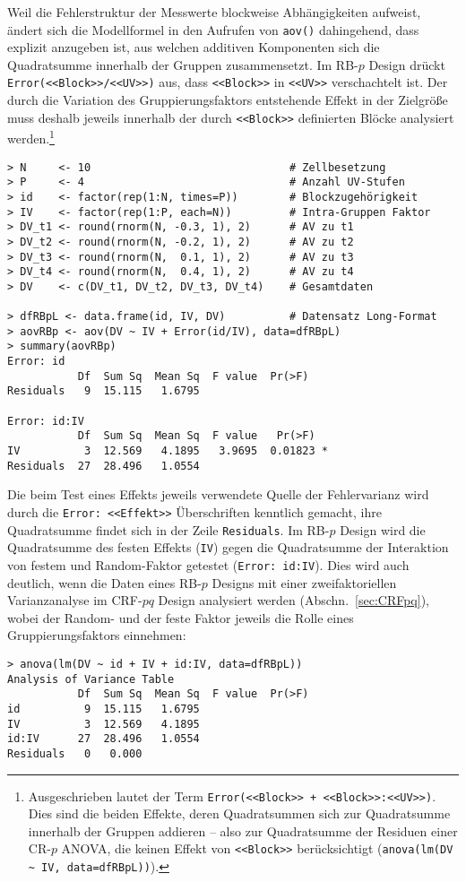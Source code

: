 Weil die Fehlerstruktur der Messwerte blockweise Abhängigkeiten aufweist, ändert sich die Modellformel in den Aufrufen von \lstinline!aov()! dahingehend, dass explizit anzugeben ist, aus welchen additiven Komponenten sich die Quadratsumme innerhalb der Gruppen zusammensetzt. Im RB-$p$ Design drückt \lstinline!Error(<<Block>>/<<UV>>)! aus, dass \lstinline!<<Block>>! in \lstinline!<<UV>>! verschachtelt ist. Der durch die Variation des Gruppierungsfaktors entstehende Effekt in der Zielgröße muss deshalb jeweils innerhalb der durch \lstinline!<<Block>>! definierten Blöcke analysiert werden.\footnote{Ausgeschrieben lautet der Term \lstinline!Error(<<Block>> + <<Block>>:<<UV>>)!. Dies sind die beiden Effekte, deren Quadratsummen sich zur Quadratsumme innerhalb der Gruppen addieren -- also zur Quadratsumme der Residuen einer CR-$p$ ANOVA, die keinen Effekt von \lstinline!<<Block>>! berücksichtigt (\lstinline!anova(lm(DV ~ IV, data=dfRBpL))!).}
\begin{lstlisting}
> N     <- 10                               # Zellbesetzung
> P     <- 4                                # Anzahl UV-Stufen
> id    <- factor(rep(1:N, times=P))        # Blockzugehörigkeit
> IV    <- factor(rep(1:P, each=N))         # Intra-Gruppen Faktor
> DV_t1 <- round(rnorm(N, -0.3, 1), 2)      # AV zu t1
> DV_t2 <- round(rnorm(N, -0.2, 1), 2)      # AV zu t2
> DV_t3 <- round(rnorm(N,  0.1, 1), 2)      # AV zu t3
> DV_t4 <- round(rnorm(N,  0.4, 1), 2)      # AV zu t4
> DV    <- c(DV_t1, DV_t2, DV_t3, DV_t4)    # Gesamtdaten

> dfRBpL <- data.frame(id, IV, DV)          # Datensatz Long-Format
> aovRBp <- aov(DV ~ IV + Error(id/IV), data=dfRBpL)
> summary(aovRBp)
Error: id
           Df  Sum Sq  Mean Sq  F value  Pr(>F)
Residuals   9  15.115   1.6795

Error: id:IV
           Df  Sum Sq  Mean Sq  F value   Pr(>F)
IV          3  12.569   4.1895   3.9695  0.01823 *
Residuals  27  28.496   1.0554
\end{lstlisting}

Die beim Test eines Effekts jeweils verwendete Quelle der Fehlervarianz wird durch die \lstinline!Error: <<Effekt>>! Überschriften kenntlich gemacht, ihre Quadratsumme findet sich in der Zeile \lstinline!Residuals!. Im RB-$p$ Design wird die Quadratsumme des festen Effekts (\lstinline!IV!) gegen die Quadratsumme der Interaktion von festem und Random-Faktor getestet (\lstinline!Error: id:IV!). Dies wird auch deutlich, wenn die Daten eines RB-$p$ Designs mit einer zweifaktoriellen Varianzanalyse im CRF-$pq$ Design analysiert werden (Abschn.\ \ref{sec:CRFpq}), wobei der Random- und der feste Faktor jeweils die Rolle eines Gruppierungsfaktors einnehmen:
\begin{lstlisting}
> anova(lm(DV ~ id + IV + id:IV, data=dfRBpL))
Analysis of Variance Table
           Df  Sum Sq  Mean Sq  F value  Pr(>F)
id          9  15.115   1.6795
IV          3  12.569   4.1895
id:IV      27  28.496   1.0554
Residuals   0   0.000
\end{lstlisting}

